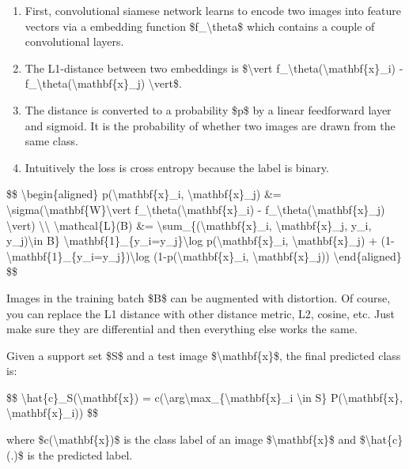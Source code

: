 \begin{enumerate}
\tightlist
\item
  First, convolutional siamese network learns to encode two images into feature vectors via a embedding function \$f\_\textbackslash theta\$ which contains a couple of convolutional layers.
\item
  The L1-distance between two embeddings is \$\textbackslash vert f\_\textbackslash theta(\textbackslash mathbf\{x\}\_i) - f\_\textbackslash theta(\textbackslash mathbf\{x\}\_j) \textbackslash vert\$.
\item
  The distance is converted to a probability \$p\$ by a linear feedforward layer and sigmoid. It is the probability of whether two images are drawn from the same class.
\item
  Intuitively the loss is cross entropy because the label is binary.
\end{enumerate}

\$\$ \textbackslash begin\{aligned\} p(\textbackslash mathbf\{x\}\_i, \textbackslash mathbf\{x\}\_j) \&= \textbackslash sigma(\textbackslash mathbf\{W\}\textbackslash vert f\_\textbackslash theta(\textbackslash mathbf\{x\}\_i) - f\_\textbackslash theta(\textbackslash mathbf\{x\}\_j) \textbackslash vert) \textbackslash\textbackslash{} \textbackslash mathcal\{L\}(B) \&= \textbackslash sum\_\{(\textbackslash mathbf\{x\}\_i, \textbackslash mathbf\{x\}\_j, y\_i, y\_j)\textbackslash in B\} \textbackslash mathbf\{1\}\_\{y\_i=y\_j\}\textbackslash log p(\textbackslash mathbf\{x\}\_i, \textbackslash mathbf\{x\}\_j) + (1-\textbackslash mathbf\{1\}\_\{y\_i=y\_j\})\textbackslash log (1-p(\textbackslash mathbf\{x\}\_i, \textbackslash mathbf\{x\}\_j)) \textbackslash end\{aligned\} \$\$

Images in the training batch \$B\$ can be augmented with distortion. Of course, you can replace the L1 distance with other distance metric, L2, cosine, etc. Just make sure they are differential and then everything else works the same.

Given a support set \$S\$ and a test image \$\textbackslash mathbf\{x\}\$, the final predicted class is:

\$\$ \textbackslash hat\{c\}\_S(\textbackslash mathbf\{x\}) = c(\textbackslash arg\textbackslash max\_\{\textbackslash mathbf\{x\}\_i \textbackslash in S\} P(\textbackslash mathbf\{x\}, \textbackslash mathbf\{x\}\_i)) \$\$

where \$c(\textbackslash mathbf\{x\})\$ is the class label of an image \$\textbackslash mathbf\{x\}\$ and \$\textbackslash hat\{c\}(.)\$ is the predicted label.

